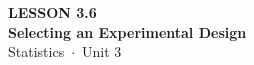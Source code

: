 \documentclass[aspectratio=169, 11pt]{beamer}
\begin{document}
{
\begin{frame}[plain]
  \vspace{2.8cm}\hspace{0.55cm}%
  \begin{minipage}{0.9\textwidth}
    {\color{goldacc}\bfseries\small LESSON 3.6}\\[0.5cm]
    {\color{white}\bfseries\LARGE Selecting an Experimental Design}\\[1.2cm]
    {\color{skymid}\small Statistics~$\cdot$~Unit 3}
  \end{minipage}
\end{frame}
}

\begin{frame}[t, plain]
\end{frame}
\end{document}
